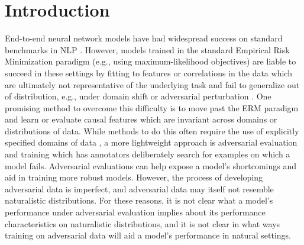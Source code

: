 \documentclass[10pt,a4paper]{article}
\newcommand{\eg}{e.g.}
\begin{document}
\section{Introduction}
End-to-end neural network models have had widespread success on standard benchmarks in NLP
\citep{wang2018glue,wang2019superglue,lee2017end,dozat2017deep}.
However, models trained in the standard Empirical Risk Minimization paradigm (\eg, using
maximum-likelihood objectives) are liable to succeed in these settings by fitting to features or
correlations in the data which are ultimately not representative of the underlying task and fail to
generalize out of distribution, \eg, under domain shift or adversarial perturbation
\citep{gururangan2018annotation,ilyas-etal-2019-adversarial}.
One promising method to overcome this difficulty is to move past the ERM paradigm and learn or
evaluate causal features which are invariant across domains or distributions of data.
While methods to do this often require the use of explicitly specified domains of data
\citep{peters-etal-2016-causal,arjovsky-etal-2020-invariant},
a more lightweight approach is adversarial evaluation and training
\citep{nie-etal-2020-adversarial,kiela-etal-2021-dynabench} which has annotators deliberately search
for examples on which a model fails.
Adversarial evaluations can help expose a model's shortcomings
and aid in training
more robust models.
However, the process of developing adversarial data is imperfect, and adversarial data may itself
not resemble naturalistic distributions.
For these reasons, it is not clear what a model's performance under adversarial evaluation implies
about its performance characteristics on naturalistic distributions,
and it is not clear in what ways training on adversarial data will aid a model's performance in
natural settings.
\end{document}
